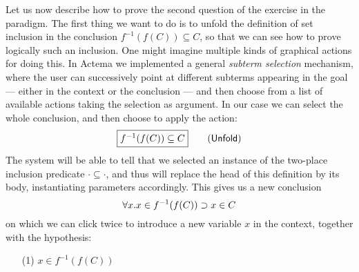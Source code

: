 Let us now describe how to prove the second question of the exercise in the
 paradigm. The first thing we want to do is to unfold the
definition of set inclusion in the conclusion $f^{-1}(f(C)) \subseteq C$, so
that we can see how to prove logically such an inclusion. One might imagine
multiple kinds of graphical actions for doing this. In Actema we implemented a
general \emph{subterm selection} mechanism, where the user can successively
point at different subterms appearing in the goal --- either in the context or
the conclusion --- and then choose from a list of available actions taking the
selection as argument. In our case we can select the whole conclusion, and then
choose to apply the  action:
$$\fbox{$f^{-1}(f(C)) \subseteq C$} \qquad \text{(\textsf{Unfold})}$$
The system will be able to tell that we
selected an instance of the two-place inclusion predicate $\cdot \subseteq
\cdot$, and thus will replace the head of this definition by its body,
instantiating parameters accordingly. This gives us a new conclusion
$$\forall x. x \in f^{-1}(f(C)) \supset x \in C$$
on which we can click twice to introduce a new variable $x$ in the context,
together with the hypothesis:
\begin{itemize}
  \item[(1)] $x \in f^{-1}(f(C))$
\end{itemize}

